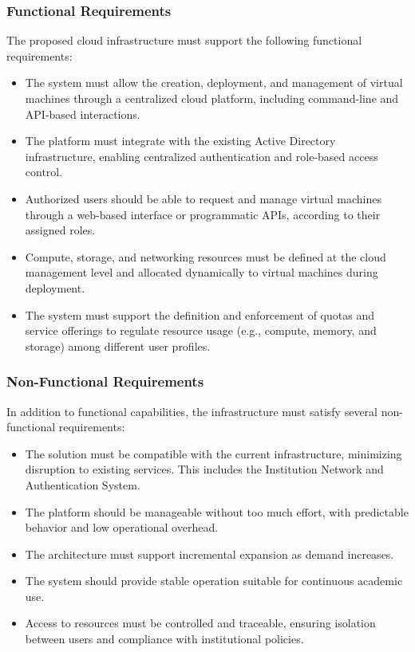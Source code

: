 \documentclass[sigplan]{acmart}
\begin{document}
        \subsubsection{Functional Requirements}
            The proposed cloud infrastructure must support the following functional requirements:
            
            \begin{itemize}
                \item The system must allow the creation, deployment, and management of virtual machines through a centralized cloud platform, including command-line and API-based interactions.
                \item The platform must integrate with the existing Active Directory infrastructure, enabling centralized authentication and role-based access control.
                \item Authorized users should be able to request and manage virtual machines through a web-based interface or programmatic APIs, according to their assigned roles.
                \item Compute, storage, and networking resources must be defined at the cloud management level and allocated dynamically to virtual machines during deployment.
                \item The system must support the definition and enforcement of quotas and service offerings to regulate resource usage (e.g., compute, memory, and storage) among different user profiles.
            \end{itemize}
        
        \subsubsection{Non-Functional Requirements}
            In addition to functional capabilities, the infrastructure must satisfy several non-functional requirements:
    
            \begin{itemize}
                \item The solution must be compatible with the current infrastructure, minimizing disruption to existing services. This includes the Institution Network and Authentication System.
                \item The platform should be manageable without too much effort, with predictable behavior and low operational overhead.
                \item The architecture must support incremental expansion as demand increases.
                \item The system should provide stable operation suitable for continuous academic use.
                \item Access to resources must be controlled and traceable, ensuring isolation between users and compliance with institutional policies.
            \end{itemize}
\end{document}
